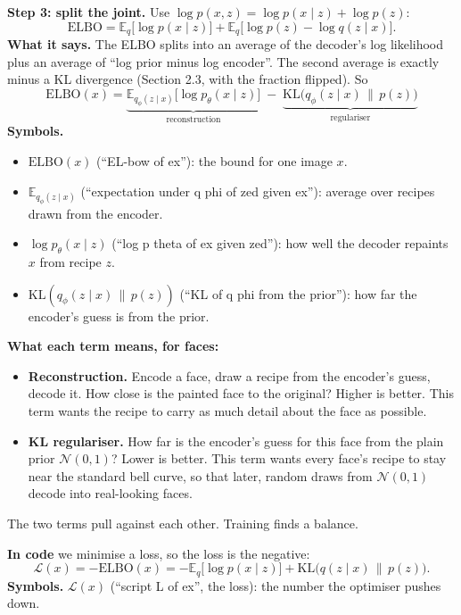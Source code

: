 \textbf{Step 3: split the joint.} Use $\log p(x, z) = \log p(x \mid z) + \log p(z)$:
\[
\mathrm{ELBO} = \mathbb{E}_q\big[\log p(x \mid z)\big] + \mathbb{E}_q\big[\log p(z) - \log q(z \mid x)\big].
\]
\textbf{What it says.} The ELBO splits into an average of the decoder's log likelihood plus an average of ``log prior minus log encoder''. The second average is exactly minus a KL divergence (Section 2.3, with the fraction flipped). So
\[
\mathrm{ELBO}(x) = \underbrace{\mathbb{E}_{q_\phi(z \mid x)}\big[\log p_\theta(x \mid z)\big]}_{\text{reconstruction}} \;-\; \underbrace{\mathrm{KL}\big(q_\phi(z \mid x)\,\|\,p(z)\big)}_{\text{regulariser}}
\]
\textbf{Symbols.}
\begin{itemize}[leftmargin=1.5em, itemsep=0pt]
\item $\mathrm{ELBO}(x)$ (``EL-bow of ex''): the bound for one image $x$.
\item $\mathbb{E}_{q_\phi(z \mid x)}$ (``expectation under q phi of zed given ex''): average over recipes drawn from the encoder.
\item $\log p_\theta(x \mid z)$ (``log p theta of ex given zed''): how well the decoder repaints $x$ from recipe $z$.
\item $\mathrm{KL}(q_\phi(z \mid x)\,\|\,p(z))$ (``KL of q phi from the prior''): how far the encoder's guess is from the prior.
\end{itemize}
\textbf{What each term means, for faces:}
\begin{itemize}[leftmargin=1.5em]
\item \textbf{Reconstruction.} Encode a face, draw a recipe from the encoder's guess, decode it. How close is the painted face to the original? Higher is better. This term wants the recipe to carry as much detail about the face as possible.
\item \textbf{KL regulariser.} How far is the encoder's guess for this face from the plain prior $\mathcal{N}(0,1)$? Lower is better. This term wants every face's recipe to stay near the standard bell curve, so that later, random draws from $\mathcal{N}(0,1)$ decode into real-looking faces.
\end{itemize}
The two terms pull against each other. Training finds a balance.

\textbf{In code} we minimise a loss, so the loss is the negative:
\[
\mathcal{L}(x) = -\mathrm{ELBO}(x) = -\mathbb{E}_q\big[\log p(x \mid z)\big] + \mathrm{KL}\big(q(z \mid x)\,\|\,p(z)\big).
\]
\textbf{Symbols.} $\mathcal{L}(x)$ (``script L of ex'', the loss): the number the optimiser pushes down.

